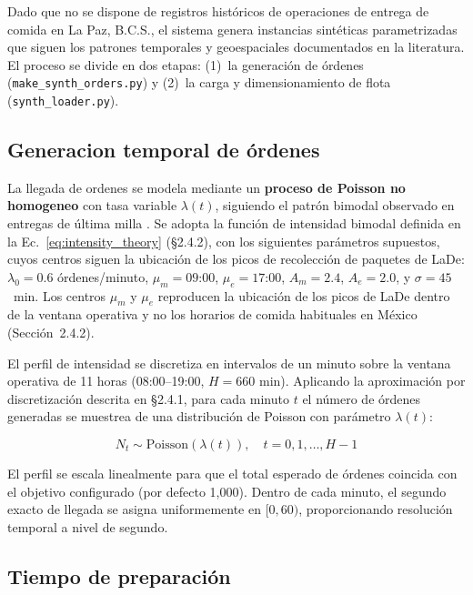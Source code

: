 \documentclass[12pt,letterpaper,oneside]{book}
\begin{document}
	Dado que no se dispone de registros históricos de operaciones de entrega de comida en La Paz, B.C.S., 
	el sistema genera instancias sintéticas parametrizadas que siguen los patrones temporales y
	geoespaciales documentados en la literatura. El proceso se divide en dos etapas: 
	(1)~la generación de órdenes (\texttt{make\_synth\_orders.py}) y 
	(2)~la carga y dimensionamiento de flota (\texttt{synth\_loader.py}).

	\subsection{Generacion temporal de órdenes}

	La llegada de ordenes se modela mediante un \textbf{proceso de Poisson no homogeneo} 
	\citep{Ross2014} con tasa variable $\lambda(t)$, siguiendo el patrón bimodal observado en
	entregas de última milla \citep{Wu2023LaDe}. Se adopta la función de intensidad bimodal definida en la
	Ec.~\eqref{eq:intensity_theory} (§2.4.2), con los siguientes parámetros supuestos, cuyos
	centros siguen la ubicación de los picos de recolección de paquetes de LaDe:
	$\lambda_0 = 0.6$ órdenes/minuto, $\mu_m = \text{09:00}$, $\mu_e = \text{17:00}$, 
	$A_m = 2.4$, $A_e = 2.0$, y $\sigma = 45$~min.  Los centros $\mu_m$ y $\mu_e$ reproducen la
	ubicación de los picos de LaDe dentro de la ventana operativa y no los horarios de comida
	habituales en México (Sección~2.4.2).

	El perfil de intensidad se discretiza en intervalos de un minuto sobre la ventana operativa de 
	11 horas (08:00--19:00, $H = 660$ min). Aplicando la aproximación por discretización descrita 
	en §2.4.1, para cada minuto $t$ el número de órdenes generadas se muestrea de una distribución 
	de Poisson con parámetro $\lambda(t)$:

	\begin{equation}
		N_t \sim \text{Poisson}\!\left(\lambda(t)\right), \quad t = 0, 1, \ldots, H-1
	\end{equation}

	El perfil se escala linealmente para que el total esperado de órdenes coincida con el objetivo 
	configurado (por defecto 1,000). Dentro de cada minuto, el segundo exacto de llegada se asigna 
	uniformemente en $[0, 60)$, proporcionando resolución temporal a nivel de segundo.

	\subsection{Tiempo de preparación}
\end{document}
